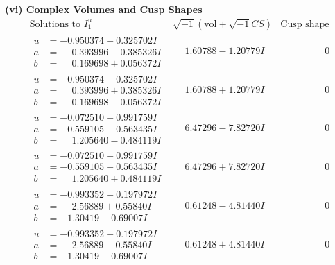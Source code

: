 \documentclass[1p]{elsarticle_modified}
\theoremstyle{definition}
\newcommand{\I}{\sqrt{-1}}
\begin{document}
\newpage\flushleft \textbf{(vi) Complex Volumes and Cusp Shapes}
$$\begin{array}{c|c|c}  
\text{Solutions to }I^u_{1}& \I (\text{vol} + \sqrt{-1}CS) & \text{Cusp shape}\\
 \hline 
\begin{aligned}
u &= -0.950374 + 0.325702 I \\
a &= \phantom{-}0.393996 - 0.385326 I \\
b &= \phantom{-}0.169698 + 0.056372 I\end{aligned}
 & \phantom{-}1.60788 - 1.20779 I & \phantom{-0.000000 } 0 \\ \hline\begin{aligned}
u &= -0.950374 - 0.325702 I \\
a &= \phantom{-}0.393996 + 0.385326 I \\
b &= \phantom{-}0.169698 - 0.056372 I\end{aligned}
 & \phantom{-}1.60788 + 1.20779 I & \phantom{-0.000000 } 0 \\ \hline\begin{aligned}
u &= -0.072510 + 0.991759 I \\
a &= -0.559105 - 0.563435 I \\
b &= \phantom{-}1.205640 - 0.484119 I\end{aligned}
 & \phantom{-}6.47296 - 7.82720 I & \phantom{-0.000000 } 0 \\ \hline\begin{aligned}
u &= -0.072510 - 0.991759 I \\
a &= -0.559105 + 0.563435 I \\
b &= \phantom{-}1.205640 + 0.484119 I\end{aligned}
 & \phantom{-}6.47296 + 7.82720 I & \phantom{-0.000000 } 0 \\ \hline\begin{aligned}
u &= -0.993352 + 0.197972 I \\
a &= \phantom{-}2.56889 + 0.55840 I \\
b &= -1.30419 + 0.69007 I\end{aligned}
 & \phantom{-}0.61248 - 4.81440 I & \phantom{-0.000000 } 0 \\ \hline\begin{aligned}
u &= -0.993352 - 0.197972 I \\
a &= \phantom{-}2.56889 - 0.55840 I \\
b &= -1.30419 - 0.69007 I\end{aligned}
 & \phantom{-}0.61248 + 4.81440 I & \phantom{-0.000000 } 0 \\ \hline\begin{aligned}

\end{aligned}
\end{array}$$
\end{document}
